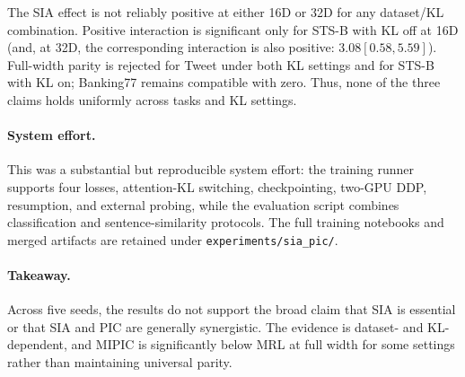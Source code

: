 The SIA effect is not reliably positive at either 16D or 32D for any
dataset/KL combination.  Positive interaction is significant only for STS-B
with KL off at 16D (and, at 32D, the corresponding interaction is also
positive: $3.08[0.58,5.59]$).  Full-width parity is rejected for Tweet under
both KL settings and for STS-B with KL on; Banking77 remains compatible with
zero.  Thus, none of the three claims holds uniformly across tasks and KL
settings.

\paragraph{System effort.}
This was a substantial but reproducible system effort: the training runner
supports four losses, attention-KL switching, checkpointing, two-GPU DDP,
resumption, and external probing, while the evaluation script combines
classification and sentence-similarity protocols.  The full training notebooks and merged
artifacts are retained under \texttt{experiments/sia\_pic/}.

\paragraph{Takeaway.}
Across five seeds, the results do not support the broad claim that SIA is
essential or that SIA and PIC are generally synergistic.  The evidence is
dataset- and KL-dependent, and MIPIC is significantly below MRL at full width
for some settings rather than maintaining universal parity.
